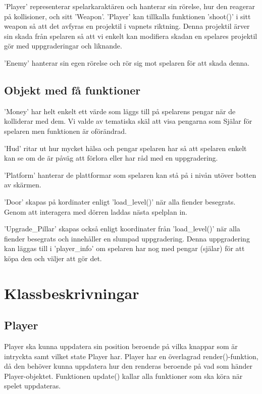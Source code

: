 \documentclass{TDP005mall}
\begin{document}
'Player' representerar spelarkaraktären och hanterar sin rörelse, hur den reagerar på kollisioner, och sitt 'Weapon'. 'Player' kan tillkalla funktionen 'shoot()' i sitt weapon så att det avfyras en projektil i vapnets riktning. Denna projektil ärver sin skada från spelaren så att vi enkelt kan modifiera skadan en spelares projektil gör med uppgraderingar och liknande.

'Enemy' hanterar sin egen rörelse och rör sig mot spelaren för att skada denna.

\subsection{Objekt med få funktioner}
'Money' har helt enkelt ett värde som läggs till på spelarens pengar när de kolliderar med dem. Vi valde av tematiska skäl att visa pengarna som Själar för spelaren men funktionen är oförändrad. 

'Hud' ritar ut hur mycket hälsa och pengar spelaren har så att spelaren enkelt kan se om de är påväg att förlora eller har råd med en uppgradering. 

'Platform' hanterar de plattformar som spelaren kan stå på i nivån utöver botten av skärmen. 

'Door' skapas på kordinater enligt 'load\_level()' när alla fiender besegrats. Genom att interagera med dörren laddas nästa spelplan in. 

'Upgrade\_Pillar' skapas också enligt koordinater från 'load\_level()' när alla fiender besegrats och innehåller en slumpad uppgradering. Denna uppgradering kan läggas till i 'player\_info' om spelaren har nog med pengar (själar) för att köpa den och väljer att gör det.

\section{Klassbeskrivningar}
\subsection{Player}
Player ska kunna uppdatera sin position beroende på vilka knappar som är intryckta samt vilket state Player har.
Player har en överlagrad render()-funktion, då den behöver kunna uppdatera hur den renderas beroende på vad som händer Player-objektet.
Funktionen update() kallar alla funktioner som ska köra när spelet uppdateras. 
\end{document}

